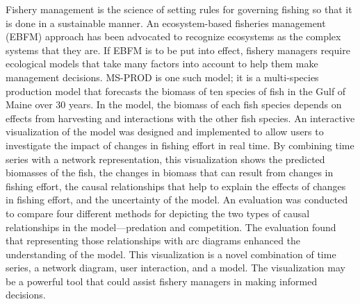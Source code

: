 \begin{abstractpage} 

Fishery management is the science of setting rules for governing fishing so that it is done in a sustainable manner.  An ecosystem-based fisheries management (EBFM) approach has been advocated to recognize ecosystems as the complex systems that they are.  If EBFM is to be put into effect, fishery managers require ecological models that take many factors into account to help them make management decisions. MS-PROD is one such model; it is a multi-species production model that forecasts the biomass of ten species of fish in the Gulf of Maine over 30 years.  In the model, the biomass of each fish species depends on effects from harvesting and interactions with the other fish species.  An interactive visualization of the model was designed and implemented to allow users to investigate the impact of changes in fishing effort in real time.  By combining time series with a network representation, this visualization shows the predicted biomasses of the fish, the changes in biomass that can result from changes in fishing effort, the causal relationships that help to explain the effects of changes in fishing effort, and the uncertainty of the model.  An evaluation was conducted to compare four different methods for depicting the two types of causal relationships in the model---predation and competition.  The evaluation found that representing those relationships with arc diagrams enhanced the understanding of the model.  This visualization is a novel combination of time series, a network diagram, user interaction, and a model. The visualization may be a powerful tool that could assist fishery managers in making informed decisions.

\end{abstractpage}